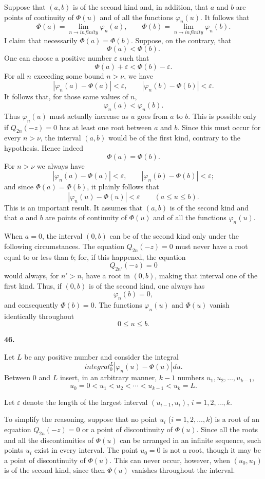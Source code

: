 \documentclass[
  paper=b5,
  fontsize=13pt,
  twoside,
  headings=normal,
  bookmarkpackage=false
]{scrartcl}
\theoremstyle{stieltjesplain}
\theoremstyle{stieltjesdefinition}
\def\int{integral}%
\def\infty{infinity}%
\def\,{ }%
\newcommand{\origsection}[1]{%
  \par\addvspace{0.85\baselineskip}%
  \phantomsection\label{sec:#1}%
  \addcontentsline{toc}{subsection}{\texorpdfstring{\S~#1}{Section #1}}%
  \noindent\textbf{#1.}\quad\ignorespaces
}
\begin{document}
Suppose that $(a,b)$ is of the second kind and, in addition, that $a$ and $b$ are points of continuity of $\Phi(u)$ \label{erratum:j85}and of all the functions $\varphi_n(u)$. It follows that
\[
 \Phi(a)=\lim_{n\to\infty}\varphi_n(a),
 \qquad
 \Phi(b)=\lim_{n\to\infty}\varphi_n(b).
\]
I claim that necessarily $\Phi(a)=\Phi(b)$. Suppose, on the contrary, that
\[
 \Phi(a)<\Phi(b).
\]
One can choose a positive number $\varepsilon$ such that
\[
 \Phi(a)+\varepsilon<\Phi(b)-\varepsilon.
\]
For all $n$ exceeding some bound $n>\nu$, we have
\[
 |\varphi_n(a)-\Phi(a)|<\varepsilon,
 \qquad
 |\varphi_n(b)-\Phi(b)|<\varepsilon.
\]
It follows that, for those same values of $n$,
\[
 \varphi_n(a)<\varphi_n(b).
\]
Thus $\varphi_n(u)$ must actually increase as $u$ goes from $a$ to $b$. This is possible only if $Q_{2n}(-z)=0$ has at least one root between $a$ and $b$. Since this must occur for every $n>\nu$, the interval $(a,b)$ would be
of the first kind, contrary to the hypothesis. Hence indeed
\[
 \Phi(a)=\Phi(b).
\]
For $n>\nu$ we always have
\[
 |\varphi_n(a)-\Phi(a)|<\varepsilon,
 \qquad
 |\varphi_n(b)-\Phi(b)|<\varepsilon;
\]
and since $\Phi(a)=\Phi(b)$, it plainly follows that
\[
 |\varphi_n(u)-\Phi(u)|<\varepsilon
 \qquad(a\leq u\leq b).
\]
This is an important result. It assumes that $(a,b)$ is of the second kind and that $a$ and $b$ are points of continuity of $\Phi(u)$ \label{erratum:j86}and of all the functions $\varphi_n(u)$.

When $a=0$, the interval $(0,b)$ can be of the second kind only under the following circumstances. The equation $Q_{2n}(-z)=0$ must never have a root equal to or less than $b$; for, if this happened, the equation
\[
 Q_{2n'}(-z)=0
\]
would always, for $n'>n$, have a root in $(0,b)$, making that interval one of the first kind. Thus, if $(0,b)$ is of the second kind, one always has
\[
 \varphi_n(b)=0,
\]
and consequently $\Phi(b)=0$. The functions $\varphi_n(u)$ and $\Phi(u)$ vanish identically throughout
\[
 0\leq u\leq b.
\]

\origsection{46}
Let $L$ be any positive number and consider the integral
\[
 \int_0^L|\varphi_n(u)-\Phi(u)|\,du.
\]
Between $0$ and $L$ insert, in an arbitrary manner, $k-1$ numbers $u_1,u_2,\ldots,u_{k-1}$,
\[
 u_0=0<u_1<u_2<\cdots<u_{k-1}<u_k=L.
\]

Let $\varepsilon$ denote the length of the largest interval $(u_{i-1},u_i)$, $i=1,2,\ldots,k$.

To simplify the reasoning, suppose that no point $u_i$ ($i=1,2,\ldots,k$) is a root of an equation $Q_{2n}(-z)=0$ or a point of discontinuity of $\Phi(u)$. Since all the roots and all the discontinuities of $\Phi(u)$ can be arranged in an infinite sequence, such points $u_i$ exist in every interval. The point $u_0=0$ is not a root, though it may be a point of discontinuity of $\Phi(u)$. This can never occur, however, when $(u_0,u_1)$ is of the second kind, since then $\Phi(u)$ vanishes throughout the interval.
\end{document}
